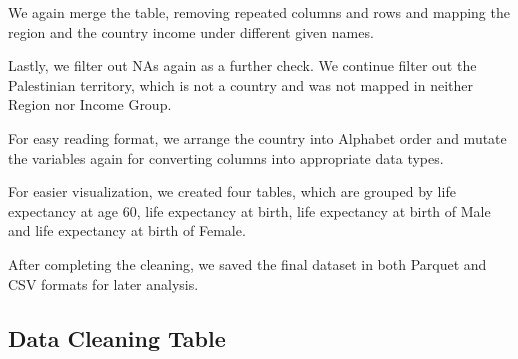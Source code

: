 \documentclass[
  letterpaper,
  DIV=11,
  numbers=noendperiod]{scrartcl}
\begin{document}
We again merge the table, removing repeated columns and rows and mapping
the region and the country income under different given names.

Lastly, we filter out NAs again as a further check. We continue filter
out the Palestinian territory, which is not a country and was not mapped
in neither Region nor Income Group.

For easy reading format, we arrange the country into Alphabet order and
mutate the variables again for converting columns into appropriate data
types.

For easier visualization, we created four tables, which are grouped by
life expectancy at age 60, life expectancy at birth, life expectancy at
birth of Male and life expectancy at birth of Female.

After completing the cleaning, we saved the final dataset in both
Parquet and CSV formats for later analysis.

\subsection{Data Cleaning Table}\label{data-cleaning-table}
\end{document}
